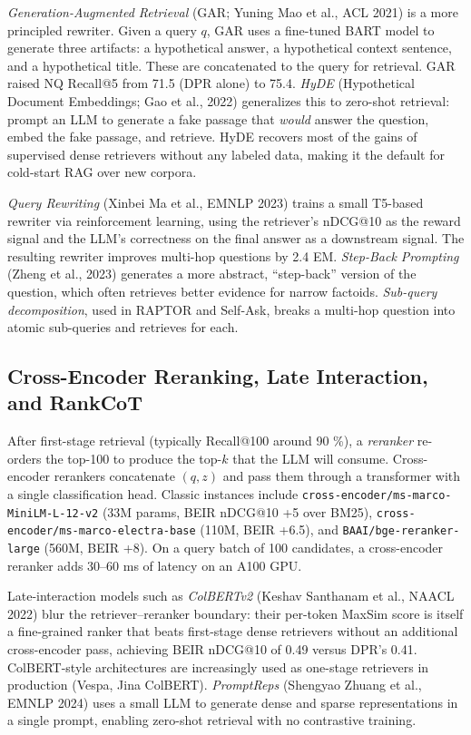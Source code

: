\emph{Generation-Augmented Retrieval} (GAR; Yuning Mao et al., ACL 2021) is a more principled rewriter. Given a query \(q\), GAR uses a fine-tuned BART model to generate three artifacts: a hypothetical answer, a hypothetical context sentence, and a hypothetical title. These are concatenated to the query for retrieval. GAR raised NQ Recall@5 from 71.5 (DPR alone) to 75.4. \emph{HyDE} (Hypothetical Document Embeddings; Gao et al., 2022) generalizes this to zero-shot retrieval: prompt an LLM to generate a fake passage that \emph{would} answer the question, embed the fake passage, and retrieve. HyDE recovers most of the gains of supervised dense retrievers without any labeled data, making it the default for cold-start RAG over new corpora.

\emph{Query Rewriting} (Xinbei Ma et al., EMNLP 2023) trains a small T5-based rewriter via reinforcement learning, using the retriever's nDCG@10 as the reward signal and the LLM's correctness on the final answer as a downstream signal. The resulting rewriter improves multi-hop questions by 2.4 EM. \emph{Step-Back Prompting} (Zheng et al., 2023) generates a more abstract, ``step-back'' version of the question, which often retrieves better evidence for narrow factoids. \emph{Sub-query decomposition}, used in RAPTOR and Self-Ask, breaks a multi-hop question into atomic sub-queries and retrieves for each.

\subsection{Cross-Encoder Reranking, Late Interaction, and RankCoT}\label{cross-encoder-reranking-late-interaction-and-rankcot}

After first-stage retrieval (typically Recall@100 around 90 \%), a \emph{reranker} re-orders the top-100 to produce the top-\(k\) that the LLM will consume. Cross-encoder rerankers concatenate \((q, z)\) and pass them through a transformer with a single classification head. Classic instances include \texttt{cross-encoder/ms-marco-MiniLM-L-12-v2} (33M params, BEIR nDCG@10 +5 over BM25), \texttt{cross-encoder/ms-marco-electra-base} (110M, BEIR +6.5), and \texttt{BAAI/bge-reranker-large} (560M, BEIR +8). On a query batch of 100 candidates, a cross-encoder reranker adds 30--60 ms of latency on an A100 GPU.

Late-interaction models such as \emph{ColBERTv2} (Keshav Santhanam et al., NAACL 2022) blur the retriever--reranker boundary: their per-token MaxSim score is itself a fine-grained ranker that beats first-stage dense retrievers without an additional cross-encoder pass, achieving BEIR nDCG@10 of 0.49 versus DPR's 0.41. ColBERT-style architectures are increasingly used as one-stage retrievers in production (Vespa, Jina ColBERT). \emph{PromptReps} (Shengyao Zhuang et al., EMNLP 2024) uses a small LLM to generate dense and sparse representations in a single prompt, enabling zero-shot retrieval with no contrastive training.


